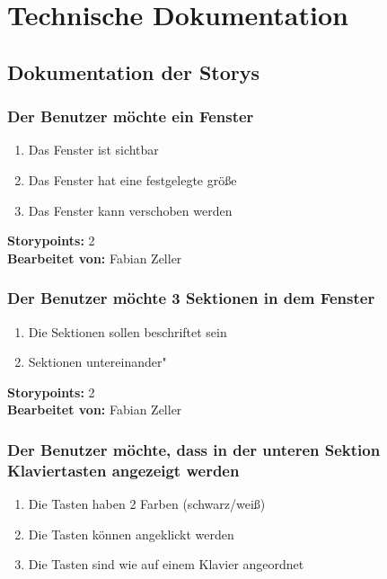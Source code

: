 \section{Technische Dokumentation}
\subsection{Dokumentation der Storys}

\subsubsection{Der Benutzer möchte ein Fenster}

\begin{enumerate}
 \item Das Fenster ist sichtbar
 \item Das Fenster hat eine festgelegte größe
 \item Das Fenster kann verschoben werden
\end{enumerate}

\textbf{Storypoints:} 2 \\
\textbf{Bearbeitet von: } Fabian Zeller \\


\subsubsection{Der Benutzer möchte 3 Sektionen in dem Fenster}


\begin{enumerate}
 \item Die Sektionen sollen beschriftet sein
 \item Sektionen untereinander"
\end{enumerate}

\textbf{Storypoints:} 2 \\
\textbf{Bearbeitet von: } Fabian Zeller \\


\subsubsection{Der Benutzer möchte, dass in der unteren Sektion Klaviertasten angezeigt werden}

\begin{enumerate}
 \item Die Tasten haben 2 Farben (schwarz/weiß)
 \item Die Tasten können angeklickt werden
 \item Die Tasten sind wie auf einem Klavier angeordnet
\end{enumerate}

